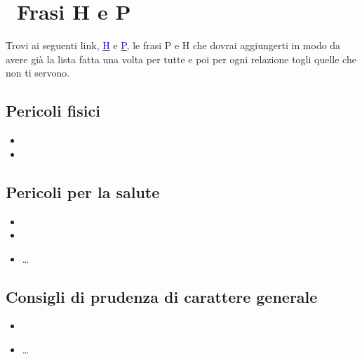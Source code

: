 \section*{\quad \   Frasi H e P}
Trovi ai seguenti link, \href{https://it.wikipedia.org/wiki/Indicazioni_di_pericolo_H}{\textcolor{blue}{H}} e \href{https://it.wikipedia.org/wiki/Consigli_P}{\textcolor{blue}{P}}, le frasi P e H che dovrai aggiungerti in modo da avere già la lista fatta una volta per tutte e poi per ogni relazione togli quelle che non ti servono.

\begingroup
\begin{multicols}{2}
\scriptsize
\subsection*{Pericoli fisici}
\begin{itemize}
    \item {}
    \item {}
\end{itemize}
\subsection*{Pericoli per la salute}
\begin{itemize}
    \item {}
    \item {}
    \item \dots
\end{itemize}
\subsection*{Consigli di prudenza di carattere generale}
\begin{itemize}
    \item {}
    \item \dots
\end{itemize}
\end{multicols}
\endgroup


